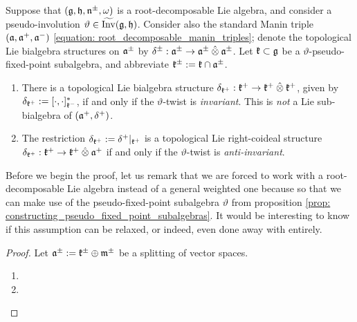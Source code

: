         \begin{theorem} \label{theorem: lie_bialgebras_from_twisted_manin_triples}
            Suppose that $(\mathfrak{g}, \mathfrak{h}, \mathfrak{n}^{\pm}, \omega)$ is a root-decomposable Lie algebra, and consider a pseudo-involution $\vartheta \in \widetilde{\operatorname{Inv}}(\mathfrak{g}, \mathfrak{h})$. Consider also the standard Manin triple $(\mathfrak{a}, \mathfrak{a}^+, \mathfrak{a}^-)$ \eqref{equation: root_decomposable_manin_triples}; denote the topological Lie bialgebra structures on $\mathfrak{a}^{\pm}$ by $\delta^{\pm}: \a^{\pm} \to \a^{\pm} \hattensor \a^{\pm}$. Let $\mathfrak{k} \subset \mathfrak{g}$ be a $\vartheta$-pseudo-fixed-point subalgebra, and abbreviate $\mathfrak{k}^{\pm} := \mathfrak{k} \cap \mathfrak{a}^{\pm}$.
            \begin{enumerate}
                \item There is a topological Lie bialgebra structure $\delta_{\k^+}: \k^+ \to \k^+ \hattensor \k^+$, given by $\delta_{\mathfrak{k}^+} := [\cdot, \cdot]_{\mathfrak{k}^-}^*$, if and only if the $\vartheta$-twist is \textit{invariant}. This is \textit{not} a Lie sub-bialgebra of $(\mathfrak{a}^+, \delta^+)$.
                \item The restriction $\delta_{\mathfrak{k}^+} := \delta^+|_{\mathfrak{k}^+}$ is a topological Lie right-coideal structure $\delta_{\k^+}: \k^+ \to \k^+ \hattensor \a^+$ if and only if the $\vartheta$-twist is \textit{anti-invariant}.
            \end{enumerate}
        \end{theorem}
        \begin{remark}
            Before we begin the proof, let us remark that we are forced to work with a root-decomposable Lie algebra instead of a general weighted one because so that we can make use of the pseudo-fixed-point subalgebra $\vartheta$ from proposition \ref{prop: constructing_pseudo_fixed_point_subalgebras}. It would be interesting to know if this assumption can be relaxed, or indeed, even done away with entirely.
        \end{remark}
            \begin{proof}
                Let $\mathfrak{a}^{\pm} := \mathfrak{k}^{\pm} \oplus \mathfrak{m}^{\pm}$ be a splitting of vector spaces. 
                \begin{enumerate}
                    \item 
                    \item 
                \end{enumerate}
            \end{proof}

